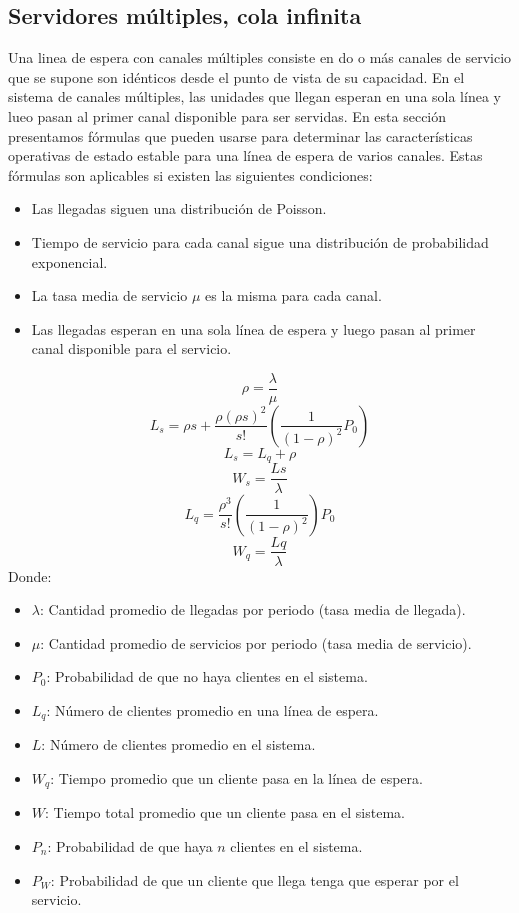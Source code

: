\documentclass[letterpaper, 12pt]{article}
\begin{document}
    \subsection*{Servidores múltiples, cola infinita}
    \justify    
    Una linea de espera con canales múltiples consiste en do o más canales de servicio que se supone son idénticos desde el punto de vista de su capacidad. En el sistema de canales múltiples, las unidades que llegan esperan en una
    sola línea y lueo pasan al primer canal disponible para ser servidas. En esta sección presentamos fórmulas que pueden usarse para determinar las características operativas de estado estable para una línea de espera de varios canales.
    Estas fórmulas son aplicables si existen las siguientes condiciones:
    \begin{itemize}
        \item Las llegadas siguen una distribución de Poisson.
        \item Tiempo de servicio para cada canal sigue una distribución de probabilidad exponencial.
        \item La tasa media de servicio \(\mu\) es la misma para cada canal.
        \item Las llegadas esperan en una sola línea de espera y luego pasan al primer canal disponible para el servicio.
    \end{itemize}
    \[\rho=\frac{\lambda}{\mu}\]
    \[L_s=\rho s+\frac{\rho(\rho s)^2}{s!}\left(\frac{1}{(1-\rho)^2}P_0\right)\]
    \[L_s=L_q+\rho\]
    \[W_s=\frac{Ls}{\lambda}\]
    \[L_q=\frac{\rho^3}{s!}\left(\frac{1}{(1-\rho)^2}\right)P_0\]
    \[W_q=\frac{Lq}{\lambda}\]
    Donde:
    \begin{itemize}
        \item \(\lambda\): Cantidad promedio de llegadas por periodo (tasa media de llegada).
        \item \(\mu\): Cantidad promedio de servicios por periodo (tasa media de servicio).
        \item \(P_0\): Probabilidad de que no haya clientes en el sistema.
        \item \(L_q\): Número de clientes promedio en una línea de espera.
        \item \(L\): Número de clientes promedio en el sistema.
        \item \(W_q\): Tiempo promedio que un cliente pasa en la línea de espera.
        \item \(W\): Tiempo total promedio que un cliente pasa en el sistema.
        \item \(P_n\): Probabilidad de que haya \(n\) clientes en el sistema.
        \item \(P_W\): Probabilidad de que un cliente que llega tenga que esperar por el servicio.
    \end{itemize}
\end{document}
